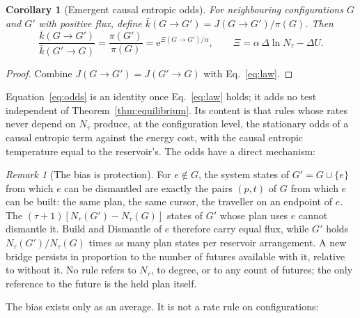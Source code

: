 \documentclass[aps,pre,preprint,superscriptaddress,nofootinbib]{revtex4-2}
\newtheorem{corollary}{Corollary}
\theoremstyle{definition}
\theoremstyle{remark}
\newtheorem{remark}{Remark}
\newcommand{\N}{N_\tau}
\newcommand{\e}{\mathrm{e}}
\begin{document}
\begin{corollary}[Emergent causal entropic odds]
\label{cor:odds}
For neighbouring configurations $G$ and $G'$ with positive flux, define $\bar k(G\to G')=J(G\to G')/\pi(G)$. Then
\begin{equation}
  \frac{\bar k(G\to G')}{\bar k(G'\to G)}=\frac{\pi(G')}{\pi(G)}=\e^{\Xi(G\to G')/\alpha},\qquad
  \Xi=\alpha\,\Delta\ln\N-\Delta U .
  \label{eq:odds}
\end{equation}
\end{corollary}
\begin{proof}
Combine $J(G\to G')=J(G'\to G)$ with Eq.~\eqref{eq:law}.
\end{proof}

Equation~\eqref{eq:odds} is an identity once Eq.~\eqref{eq:law} holds; it adds no test independent of Theorem~\ref{thm:equilibrium}. Its content is that rules whose rates never depend on $\N$ produce, at the configuration level, the stationary odds of a causal entropic term against the energy cost, with the causal entropic temperature equal to the reservoir's. The odds have a direct mechanism:

\begin{remark}[The bias is protection]
\label{rem:protection}
For $e\notin G$, the system states of $G'=G\cup\{e\}$ from which $e$ can be dismantled are exactly the pairs $(p,t)$ of $G$ from which $e$ can be built: the same plan, the same cursor, the traveller on an endpoint of $e$. The $(\tau+1)[\N(G')-\N(G)]$ states of $G'$ whose plan uses $e$ cannot dismantle it. Build and Dismantle of $e$ therefore carry equal flux, while $G'$ holds $\N(G')/\N(G)$ times as many plan states per reservoir arrangement. A new bridge persists in proportion to the number of futures available with it, relative to without it. No rule refers to $\N$, to degree, or to any count of futures; the only reference to the future is the held plan itself.
\end{remark}

The bias exists only as an average. It is not a rate rule on configurations:
\end{document}
